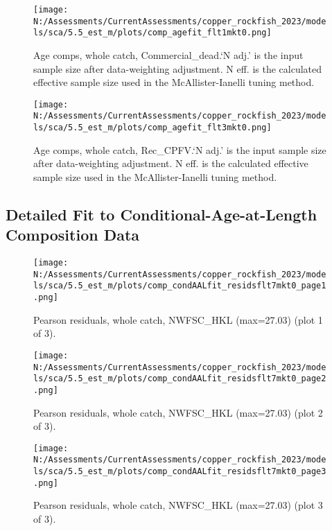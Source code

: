 \documentclass[11pt,
  english,
  letterpaper,
]{article}
\begin{document}
\begin{figure}
\centering
\texttt{[image: N:/Assessments/CurrentAssessments/copper\_rockfish\_2023/models/sca/5.5\_est\_m/plots/comp\_agefit\_flt1mkt0.png]}
\caption{Age comps, whole catch, Commercial\_dead.`N adj.' is the input sample size after data-weighting adjustment. N eff. is the calculated effective sample size used in the McAllister-Ianelli tuning method.\label{fig:comp_agefit_flt1mkt0}}
\end{figure}

\begin{figure}
\centering
\texttt{[image: N:/Assessments/CurrentAssessments/copper\_rockfish\_2023/models/sca/5.5\_est\_m/plots/comp\_agefit\_flt3mkt0.png]}
\caption{Age comps, whole catch, Rec\_CPFV.`N adj.' is the input sample size after data-weighting adjustment. N eff. is the calculated effective sample size used in the McAllister-Ianelli tuning method.\label{fig:comp_agefit_flt3mkt0}}
\end{figure}

\newpage

\hypertarget{caal-data}{%
\subsection{Detailed Fit to Conditional-Age-at-Length Composition Data}\label{caal-data}}

\begin{figure}
\centering
\texttt{[image: N:/Assessments/CurrentAssessments/copper\_rockfish\_2023/models/sca/5.5\_est\_m/plots/comp\_condAALfit\_residsflt7mkt0\_page1.png]}
\caption{Pearson residuals, whole catch, NWFSC\_HKL (max=27.03) (plot 1 of 3).\label{fig:comp_condAALfit_residsflt7mkt0_page1}}
\end{figure}

\begin{figure}
\centering
\texttt{[image: N:/Assessments/CurrentAssessments/copper\_rockfish\_2023/models/sca/5.5\_est\_m/plots/comp\_condAALfit\_residsflt7mkt0\_page2.png]}
\caption{Pearson residuals, whole catch, NWFSC\_HKL (max=27.03) (plot 2 of 3).\label{fig:comp_condAALfit_residsflt7mkt0_page2}}
\end{figure}

\begin{figure}
\centering
\texttt{[image: N:/Assessments/CurrentAssessments/copper\_rockfish\_2023/models/sca/5.5\_est\_m/plots/comp\_condAALfit\_residsflt7mkt0\_page3.png]}
\caption{Pearson residuals, whole catch, NWFSC\_HKL (max=27.03) (plot 3 of 3).\label{fig:comp_condAALfit_residsflt7mkt0_page3}}
\end{figure}
\end{document}
